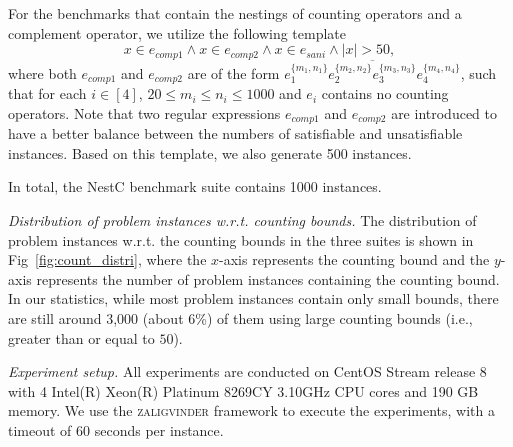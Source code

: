 For the benchmarks that contain the nestings of counting operators and a complement operator, we utilize the following template
\[x \in e_{comp1} \wedge x \in e_{comp2} \wedge x \in e_{sani} \wedge |x| > 50, \]
where both $e_{comp1}$ and $e_{comp2}$ are of the form $\overline{e_1^{\{m_1,n_1\}}e_2^{\{m_2,n_2\}}e_3^{\{m_3,n_3\}} e_4^{\{m_4, n_4\}}}$, such that for each $i \in [4]$, $20 \leq m_i\leq n_i\leq 1000$ and $e_i$ contains no counting operators. Note that two regular expressions $e_{comp1} $ and $e_{comp2}$ are introduced to have a better balance between the numbers of satisfiable and unsatisfiable instances. Based on this template, we also generate 500 instances. 

In total, the NestC benchmark suite contains 1000 instances. 


\medskip
\noindent
\emph{Distribution of problem instances w.r.t. counting bounds. }
The distribution of problem instances w.r.t. the counting bounds in the three suites is shown in Fig~\ref{fig:count_distri}, where the $x$-axis represents the counting bound and the $y$-axis represents the number of problem instances containing the counting bound. 
In our statistics, while most problem instances contain only small bounds, there are still around 3,000  (about 6\%) of them using large counting bounds (i.e., greater than or equal to $50$).

\medskip
\noindent
\emph{Experiment setup.}
All experiments are conducted on CentOS Stream release 8 with 4 Intel(R) Xeon(R) Platinum 8269CY 3.10GHz CPU cores and 190 GB memory. We use the \textsc{zaligvinder} framework \cite{zaligvinder_2021} to execute the experiments, with a timeout of 60 seconds per instance.


